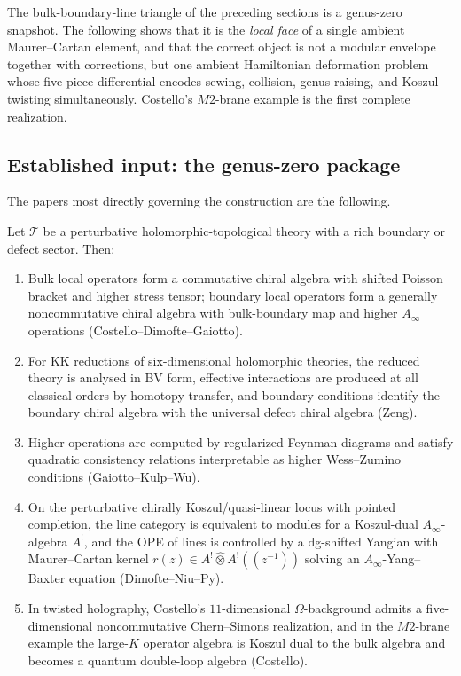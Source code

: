 The bulk-boundary-line triangle of the preceding sections
is a genus-zero snapshot. The following shows that it is the \emph{local face}
of a single ambient Maurer--Cartan element, and that the correct
object is not a modular envelope together with corrections, but one
ambient Hamiltonian deformation problem whose five-piece differential
encodes sewing, collision, genus-raising, and Koszul twisting
simultaneously. Costello's $M2$-brane example is the first
complete realization.

\subsection{Established input: the genus-zero package}

The papers most directly governing the construction are the
following.

\begin{theorem}
\ClaimStatusProvedElsewhere
Let $\mathcal{T}$ be a perturbative holomorphic-topological theory
with a rich boundary or defect sector. Then:
\begin{enumerate}[label=\textup{(\arabic*)}]
\item Bulk local operators form a commutative chiral algebra with
shifted Poisson bracket and higher stress tensor; boundary local
operators form a generally noncommutative chiral algebra with
bulk-boundary map and higher $A_\infty$ operations
\textup{(Costello--Dimofte--Gaiotto)}.
\item For KK reductions of six-dimensional holomorphic theories,
the reduced theory is analysed in BV form, effective interactions
are produced at all classical orders by homotopy transfer, and
boundary conditions identify the boundary chiral algebra with the
universal defect chiral algebra \textup{(Zeng)}.
\item Higher operations are computed by regularized Feynman diagrams
and satisfy quadratic consistency relations interpretable as higher
Wess--Zumino conditions \textup{(Gaiotto--Kulp--Wu)}.
\item On the perturbative chirally Koszul/quasi-linear locus with
pointed completion, the line category is equivalent to modules
for a Koszul-dual $A_\infty$-algebra $A^!$, and the OPE of lines
is controlled by a dg-shifted Yangian with Maurer--Cartan kernel
$r(z) \in A^! \widehat\otimes A^!(\!(z^{-1})\!)$
solving an $A_\infty$-Yang--Baxter equation
\textup{(Dimofte--Niu--Py)}.
\item In twisted holography, Costello's $11$-dimensional
$\Omega$-background admits a five-dimensional noncommutative
Chern--Simons realization, and in the $M2$-brane example the
large-$K$ operator algebra is Koszul dual to the bulk algebra
and becomes a quantum double-loop algebra \textup{(Costello)}.
\end{enumerate}
\end{theorem}

